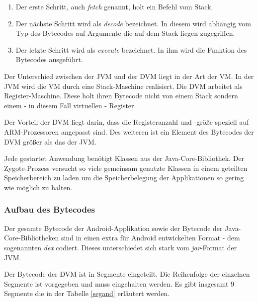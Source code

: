  \begin{enumerate}
    \item Der erste Schritt, auch \textit{fetch} genannt, holt ein Befehl vom Stack.
    \item Der nächste Schritt wird als \textit{decode} bezeichnet. In diesem wird abhängig vom Typ des Bytecodes auf Argumente die auf dem Stack liegen zugegriffen.
    \item Der letzte Schritt wird als \textit{execute} bezeichnet. In ihm wird die Funktion des Bytecodes ausgeführt.
 \end{enumerate}
 
 Der Unterschied zwischen der JVM und der DVM liegt in der Art der VM. In der JVM wird die VM durch eine Stack-Maschine realisiert. Die DVM arbeitet als Register-Maschine. Diese holt ihren Bytecode nicht von einem Stack sondern einem - in diesem Fall virtuellen - Register.
 
 Der Vorteil der DVM liegt darin, dass die Registeranzahl und -größe speziell auf ARM-Prozessoren angepasst sind. Des weiteren ist ein Element des Bytecodes der DVM größer als das der JVM.
 
 Jede gestartet Anwendung benötigt Klassen aus der Java-Core-Bibliothek. Der Zygote-Prozess versucht so viele gemeinsam genutzte Klassen in einem geteilten Speicherbereich zu laden um die Speicherbelegung der Applikationen so gering wie möglich zu halten.
 
\subsubsection{Aufbau des Bytecodes}

Der gesamte Bytecode der Android-Applikation sowie der Bytecode der Java-Core-Bibliotheken sind in einen extra für Android entwickelten Format - dem sogenannten \textit{dex} codiert. Dieses unterschiedet sich stark vom \textit{jar}-Format der JVM.

Der Bytecode der DVM ist in Segmente eingeteilt. Die Reihenfolge der einzelnen Segmente ist vorgegeben und muss eingehalten werden. Es gibt insgesamt 9 Segmente die in der Tabelle \ref{segand} erläutert werden.

